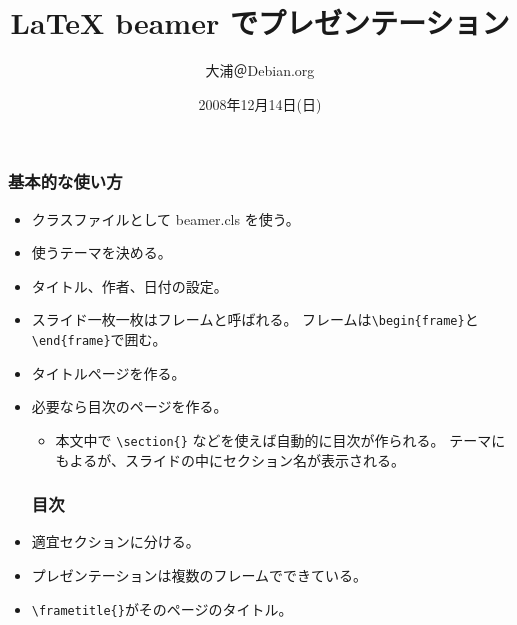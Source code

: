 \documentclass[mingoth,a4paper]{jsarticle}
\begin{document}
\begin{commandline}
\subsubsection{基本的な使い方}

\begin{itemize}
\item クラスファイルとして beamer.cls を使う。
\item 使うテーマを決める。
\begin{commandline}
\end{commandline}
\item タイトル、作者、日付の設定。

\begin{commandline}
\title{LaTeX beamer でプレゼンテーション}
\author{大浦＠Debian.org}
\date{2008年12月14日(日)}
\end{commandline}

\item スライド一枚一枚はフレームと呼ばれる。
  フレームは\verb|\begin{frame}|と\verb|\end{frame}|で囲む。
\item タイトルページを作る。

\begin{commandline}
\begin{frame}
\titlepage{}
\end{frame}
\end{commandline}

\item 必要なら目次のページを作る。
  \begin{itemize}
  \item 本文中で \verb|\section{}| などを使えば自動的に目次が作られる。
    テーマにもよるが、スライドの中にセクション名が表示される。
  \end{itemize}

\begin{commandline}
\begin{frame}
\frametitle{目次}
\tableofcontents{}
\end{frame}
\end{commandline}

\item 適宜セクションに分ける。
\item プレゼンテーションは複数のフレームでできている。
\item \verb|\frametitle{}|がそのページのタイトル。


\end{itemize}
\end{commandline}
\end{document}
